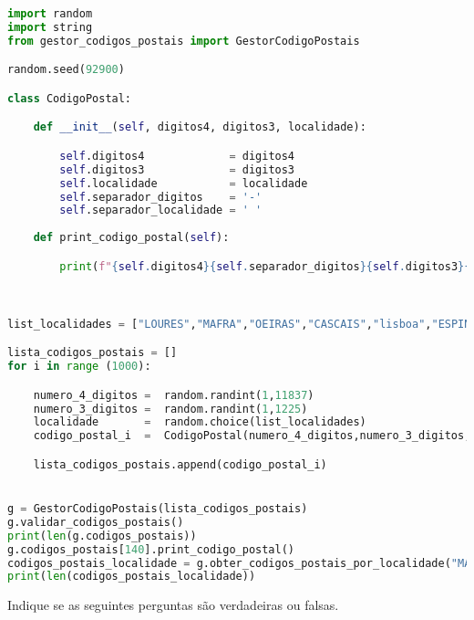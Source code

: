 \documentclass[12pt,varwidth=16cm,border=17pt]{standalone}
\begin{document}
\begin{lstlisting}[language=Python]
import random
import string
from gestor_codigos_postais import GestorCodigoPostais

random.seed(92900)

class CodigoPostal:

    def __init__(self, digitos4, digitos3, localidade):

        self.digitos4             = digitos4
        self.digitos3             = digitos3
        self.localidade           = localidade
        self.separador_digitos    = '-'
        self.separador_localidade = ' '
    
    def print_codigo_postal(self):

        print(f"{self.digitos4}{self.separador_digitos}{self.digitos3}{self.separador_localidade}{self.localidade}")

        

list_localidades = ["LOURES","MAFRA","OEIRAS","CASCAIS","lisboa","ESPINHO","MAIA","Amarante","valongo","OVAR","Pombal","Batalha"]

lista_codigos_postais = []
for i in range (1000):

    numero_4_digitos =  random.randint(1,11837)
    numero_3_digitos =  random.randint(1,1225)
    localidade       =  random.choice(list_localidades)
    codigo_postal_i  =  CodigoPostal(numero_4_digitos,numero_3_digitos,localidade)

    lista_codigos_postais.append(codigo_postal_i)


g = GestorCodigoPostais(lista_codigos_postais)
g.validar_codigos_postais()
print(len(g.codigos_postais))
g.codigos_postais[140].print_codigo_postal()
codigos_postais_localidade = g.obter_codigos_postais_por_localidade("MAIA")
print(len(codigos_postais_localidade))
\end{lstlisting}

Indique se as seguintes perguntas são verdadeiras ou falsas.
\end{document}
